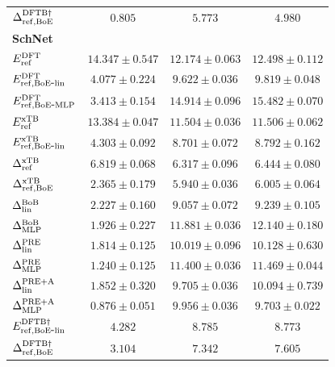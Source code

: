 \begin{table}[H]
\begin{tabular}{lccc}
\(\Delta^{\rm DFTB\dagger}_{\rm ref,BoE}\) & $0.805$ & $5.773$ & $4.980$ \\
\multicolumn{4}{l}{\textbf{SchNet}} \\
\(E_{\rm ref}^{\rm DFT}\) & $14.347\pm0.547$ & $12.174\pm0.063$ & $12.498\pm0.112$ \\
\(E_{\rm ref,BoE\mbox{-}lin}^{\rm DFT}\) & $4.077\pm0.224$ & $9.622\pm0.036$ & $9.819\pm0.048$ \\
\(E_{\rm ref,BoE\mbox{-}MLP}^{\rm DFT}\) & $3.413\pm0.154$ & $14.914\pm0.096$ & $15.482\pm0.070$ \\
\(E_{\rm ref}^{\rm xTB}\) & $13.384\pm0.047$ & $11.504\pm0.036$ & $11.506\pm0.062$ \\
\(E_{\rm ref,BoE\mbox{-}lin}^{\rm xTB}\) & $4.303\pm0.092$ & $8.701\pm0.072$ & $8.792\pm0.162$ \\
\(\Delta^{\rm xTB}_{\rm ref}\) & $6.819\pm0.068$ & $6.317\pm0.096$ & $6.444\pm0.080$ \\
\(\Delta^{\rm xTB}_{\rm ref,BoE}\) & $2.365\pm0.179$ & $5.940\pm0.036$ & $6.005\pm0.064$ \\
\(\Delta^{\rm BoB}_{\rm lin}\) & $2.227\pm0.160$ & $9.057\pm0.072$ & $9.239\pm0.105$ \\
\(\Delta^{\rm BoB}_{\rm MLP}\) & $1.926\pm0.227$ & $11.881\pm0.036$ & $12.140\pm0.180$ \\
\(\Delta^{\rm PRE}_{\rm lin}\) & $1.814\pm0.125$ & $10.019\pm0.096$ & $10.128\pm0.630$ \\
\(\Delta^{\rm PRE}_{\rm MLP}\) & $1.240\pm0.125$ & $11.400\pm0.036$ & $11.469\pm0.044$ \\
\(\Delta^{\rm PRE+A}_{\rm lin}\) & $1.852\pm0.320$ & $9.705\pm0.036$ & $10.094\pm0.739$ \\
\(\Delta^{\rm PRE+A}_{\rm MLP}\) & $0.876\pm0.051$ & $9.956\pm0.036$ & $9.703\pm0.022$ \\
\(E_{\rm ref,BoE\mbox{-}lin}^{\rm DFTB\dagger}\) & $4.282$ & $8.785$ & $8.773$ \\
\(\Delta^{\rm DFTB\dagger}_{\rm ref,BoE}\) & $3.104$ & $7.342$ & $7.605$ \\
\bottomrule\end{tabular}
\end{table}
